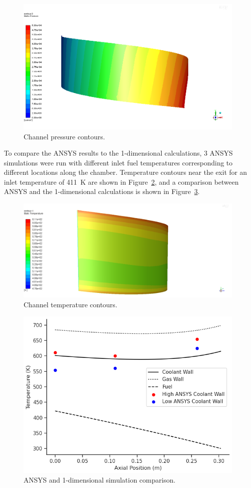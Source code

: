 \documentclass[11pt]{article}
\begin{document}
\begin{figure}[H]
	\centering
  	\includegraphics[width=0.7\linewidth, trim={0 0 5cm 0}, clip]{pressure-2}
  	\caption{Channel pressure contours.}
  	\label{fig:pressure_contours}
\end{figure}

To compare the ANSYS results to the 1-dimensional calculations, 3 ANSYS simulations were run with different inlet fuel temperatures corresponding to different locations along the chamber. Temperature contours near the exit for an inlet temperature of \SI{411}{\kelvin} are shown in Figure~\ref{fig:temp_contours}, and a comparison between ANSYS and the 1-dimensional calculations is shown in Figure~\ref{fig:comparison}.

\begin{figure}[H]
	\centering
  	\includegraphics[width=0.7\linewidth, trim={0 0 5cm 0}, clip]{temperature-3}
  	\caption{Channel temperature contours.}
  	\label{fig:temp_contours}
\end{figure}

\begin{figure}[H]
	\centering
  	\includegraphics[width=0.7\linewidth]{Temperatures_ANSYS}
  	\caption{ANSYS and 1-dimensional simulation comparison.}
  	\label{fig:comparison}
\end{figure}
\end{document}
